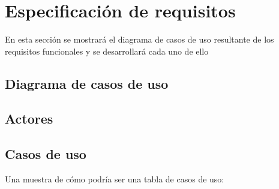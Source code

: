 \section{Especificación de requisitos}\label{especificación-de-requisitos}

En esta sección se mostrará el diagrama de casos de uso resultante de los requisitos funcionales y se desarrollará cada uno de ello

\subsection{Diagrama de casos de uso}\label{diagrama-de-casos-de-uso}


\subsection{Actores}\label{actores}

\subsection{Casos de uso}\label{casos-de-uso}

Una muestra de cómo podría ser una tabla de casos de uso:

